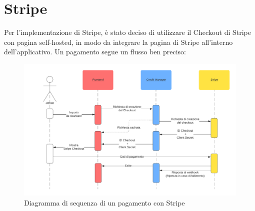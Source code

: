 \section{Stripe}
Per l'implementazione di Stripe, \`e stato deciso di utilizzare il Checkout di Stripe con pagina self-hosted, in modo da integrare la pagina di Stripe all'interno
dell'applicativo. Un pagamento segue un flusso ben preciso:
\begin{figure}[H]
  \centering
  \includegraphics[width=14cm]{images/stripe-pagamento-diagramma.png}
  \caption{Diagramma di sequenza di un pagamento con Stripe}
  \label{stripepayment}
\end{figure}

